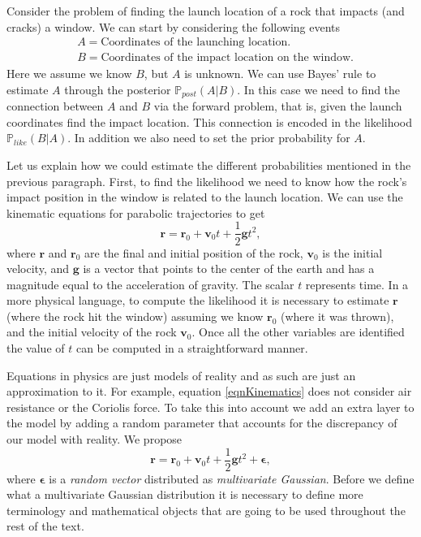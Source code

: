 \documentclass{sfuthesis}
\newcommand{\post}{\mathbb{P}_{post}}
\newcommand{\like}{\mathbb{P}_{like}}
\begin{document}
Consider the problem of finding the launch location of a rock that impacts (and cracks) a window. 
We can start by considering the following events
\begin{align*}
& A=\text{Coordinates of the launching location}.\\
& B= \text{Coordinates of the impact location on the window}.
\end{align*}
Here we assume we know $B$, but $A$ is unknown. We can use Bayes' rule to estimate $A$ through
the posterior $\post(A|B)$. In this case
we need to find the connection between $A$ and $B$ via the forward problem, that is, given 
the launch coordinates find the impact location. This connection is encoded in the likelihood $\like(B|A)$.
In addition we also need to set the prior probability for $A$. 
\newline



Let us explain how we could estimate the different probabilities mentioned in the previous paragraph. 
First, to find the likelihood
we need to know how the rock's impact position  in the window  is related to the launch location. 
We can use
the kinematic equations  for parabolic trajectories to get \cite{arnol2013mathematical}
\begin{equation}\label{eqnKinematics}
\textbf{r}=\textbf{r}_{0}+\textbf{v}_{0}t+\frac{1}{2}\textbf{g}t^{2},
\end{equation} 
where $\textbf{r}$ and $\textbf{r}_{0}$ are the final and initial position of the rock, 
$\textbf{v}_{0}$ is 
the initial velocity,  and $\textbf{g}$ is  a vector that points to the center of the earth and has a 
magnitude equal to the acceleration of gravity. The scalar $t$ represents time.
In a more physical language, to compute the likelihood it is necessary to estimate $\textbf{r}$ (where the 
rock hit the window) assuming we know $\textbf{r}_{0}$ (where it was thrown), and the initial velocity 
of the rock $\textbf{v}_{0}$. 
Once all the other variables are identified the value of $t$ can be computed in a straightforward manner. 

Equations in physics are just models of reality and as such are just an approximation to it. 
For example, equation \eqref{eqnKinematics} does not consider air resistance or the
Coriolis force. To take
this into account we add an extra layer to the model by adding a random parameter that accounts
for the discrepancy of our model with reality. We propose 
\begin{equation}\label{eqnParabolicEpsilon}
\textbf{r}=\textbf{r}_{0}+\textbf{v}_{0}t+\frac{1}{2}\textbf{g}t^{2}+\mathbf{\epsilon},
\end{equation} 
where $\mathbf{\epsilon}$ is a \textit{random vector} distributed as \textit{multivariate Gaussian}. 
Before we define what a multivariate Gaussian distribution it is necessary to define more terminology and mathematical objects  that are going 
to be used throughout the rest of the text. 
\end{document}
